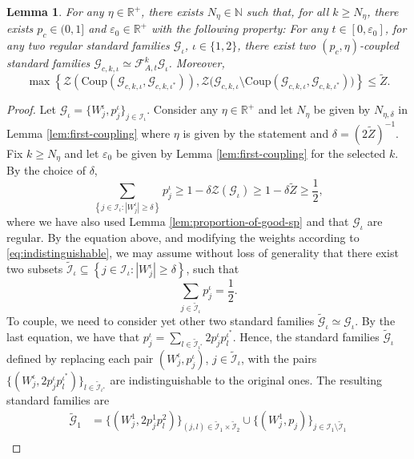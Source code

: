 \documentclass{amsart}
\numberwithin{equation}{section}
\newtheorem{lemma}[theorem]{Lemma}
\newcommand\ve{\varepsilon}
\renewcommand{\ge}{\geqslant}
\renewcommand{\le}{\leqslant}
\newcommand\cF{{\mathcal F}}
\newcommand\cG{{\mathcal G}}
\newcommand\cI{{\mathcal I}}
\newcommand\cZ{{\mathcal Z}}
\newcommand\bN{{\mathbb N}}
\newcommand\bR{{\mathbb R}}
\newcommand{\catt}{\cF_{A,t}}
\newcommand{\Coup}{\text{Coup}}
\begin{document}
\begin{lemma}\label{lem:first-coupl-s-f}
 For any \(\eta \in \bR^+\), there exists \(N_{\eta} \in \bN\) such that, for all \(k \ge N_{\eta}\), there exists \(p_c \in (0,1]\) and \(\ve_0 \in \bR^+\) with the following property: For any \(t \in [0,\ve_0]\), for any two regular standard families \(\cG_\iota\), \(\iota \in \{1,2\}\), there exist two \((p_c, \eta)\)-coupled standard families \(\cG_{c,k,\iota} \simeq \catt^k \cG_\iota\). Moreover, 
 \[
  \max\left\{\cZ\left(\Coup (\cG_{c,k,\iota}, \cG_{c,k,\iota^*})\right) ,  \cZ\bigl(\cG_{c,k,\iota} \setminus  \Coup(\cG_{c,k,\iota}, \cG_{c,k,\iota^*})\bigr) \right\} \le \widetilde Z.
 \]

\end{lemma}
\begin{proof}
Let \(\cG_\iota = \{W_j^\iota, p_j^\iota\}_{j \in \cI_\iota}\). Consider any \(\eta \in \bR^+\) and let \(N_{\eta}\) be given by \(N_{\eta, \delta}\) in Lemma \ref{lem:first-coupling} where \(\eta\) is given by the statement and \(\delta = (2 \widetilde Z)^{-1}\). Fix \(k \ge N_{\eta}\) and let \(\ve_0\) be given by Lemma \ref{lem:first-coupling} for the selected \(k\). By the choice of \(\delta\),
\[
\sum_{\left\{j \in \cI_\iota: |W_{j}^\iota| \ge \delta \right\} }p_{j}^\iota \ge 1 - \delta \cZ(\cG_\iota) \ge 1 - \delta \widetilde Z \ge \frac 1 2,
\]
where we have also used Lemma \ref{lem:proportion-of-good-sp} and that \(\cG_\iota\) are regular. By the equation above, and modifying the weights according to \eqref{eq:indistinguishable}, we may assume without loss of generality that there exist two subsets \(\widetilde \cI_{\iota} \subseteq \left\{j \in \cI_\iota: |W_{j}^\iota| \ge \delta \right\}\), such that
\[
 \sum_{j \in \widetilde \cI_\iota}p^\iota_{j} = \frac 1 2.
\]
To couple, we need to consider yet other two standard families \(\widetilde \cG_{\iota} \simeq \cG_{\iota}\). By the last equation, we have that \(p^{\iota}_{j} =\sum_{l \in \widetilde\cI_{\iota^*}}2p^\iota_{j}p^{\iota^*}_{l}\). Hence, the standard families \(\widetilde \cG_\iota\) defined by replacing each pair \((W^\iota_{j}, p^\iota_j) \), \(j \in \widetilde \cI_{\iota}\), with the pairs \(\{(W^\iota_{j}, 2p^\iota_{j}p^{\iota^*}_{l})\}_{l \in \widetilde \cI_{\iota^*}}\) are indistinguishable to the original ones. The resulting standard families are
\[
\begin{split}
    \widetilde \cG_{1} &= \{(W^{1}_{j}, 2p^1_{j}p^{2}_{l})\}_{(j,l) \in \widetilde \cI_{1} \times \widetilde \cI_{2}} \cup \{(W_j^{1}, p_j)\}_{j \in \cI_{1} \setminus \widetilde\cI_{1}}\\

\end{split}\]
\end{proof}
\end{document}
